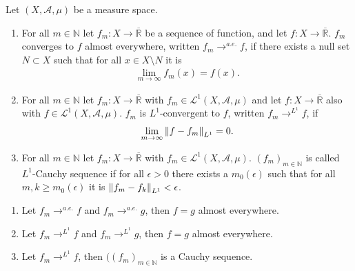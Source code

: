 \begin{definition}
    Let \( (X, \mathcal{A}, \mu) \) be a measure space.
    \begin{enumerate}
        \item For all \(m \in \mathbb{N}\) let \(f_m: X \rightarrow \overline{\mathbb{R}}\) be a sequence of function, and let \(f: X \rightarrow \overline{\mathbb{R}}\). \(f_m\) converges to \(f\) almost everywhere, written \(f_m \rightarrow^{a.e.} f\), if there exists a null set \(N \subset X\) such that for all \(x \in X \setminus N\) it is
        \begin{align}
            \lim_{m \rightarrow \infty} f_m(x) = f(x) \text{.}
        \end{align}
        \item For all \(m \in \mathbb{N}\) let \(f_m: X \rightarrow \overline{\mathbb{R}}\) with \(f_m \in \mathcal{L}^1 (X, \mathcal{A}, \mu) \) and let \(f: X \rightarrow \overline{\mathbb{R}}\) also with \(f \in \mathcal{L}^1 (X, \mathcal{A}, \mu) \). \(f_m\) is \(L^1\)-convergent to \(f\), written \(f_m \rightarrow^{L^1} f\), if
        \begin{align}
            \lim_{m \rightarrow \infty} \left\lVert f - f_m\right\rVert_{L^1} = 0 \text{.}
        \end{align}
        \item For all \(m \in \mathbb{N}\) let \(f_m: X \rightarrow \overline{\mathbb{R}}\) with \(f_m \in \mathcal{L}^1 (X, \mathcal{A}, \mu) \). \((f_m)_{m \in \mathbb{N}}\) is called \(L^1\)-Cauchy sequence if for all \(\epsilon > 0\) there exists a \(m_0(\epsilon)\) such that for all \(m, k \geq m_0(\epsilon)\) it is \(\left\lVert f_m - f_k\right\rVert_{L^1} < \epsilon \).
    \end{enumerate}
\end{definition}
%
\begin{proposition}
    \begin{enumerate}
    \item Let \(f_m \rightarrow^{a.e.} f\) and \(f_m \rightarrow^{a.e.} g\), then \(f = g\) almost everywhere.
    \item Let \(f_m \rightarrow^{L^1} f\) and \(f_m \rightarrow^{L^1} g\), then \(f = g\) almost everywhere.
    \item Let \(f_m \rightarrow^{L^1} f\), then \(((f_m)_{m \in \mathbb{N}}\) is a Cauchy sequence.
    \end{enumerate}
\end{proposition}